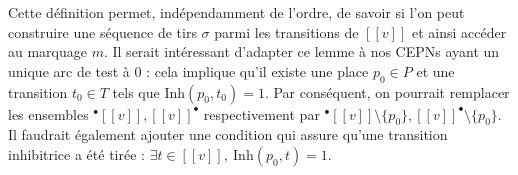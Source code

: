\documentclass{article}
\theoremstyle{remark}
\theoremstyle{remark}
\newcommand{\preb}[1]{{}^\bullet #1}
\newcommand{\postb}[1]{#1^\bullet}
\newcommand{\inhibitor}{\mathrm{Inh}}
\newcommand{\supp}[1]{[\![#1]\!]}
\begin{document}
Cette définition permet, indépendamment de l'ordre, de savoir si l'on peut construire une séquence de tirs $\sigma$ parmi les transitions de $[\![v]\!]$ et ainsi accéder au marquage $m$. Il serait intéressant d'adapter ce lemme à nos CEPNs ayant un unique arc de test à 0 : cela implique qu'il existe une place $p_0 \in P$ et une transition $t_0 \in T$ tels que $\inhibitor(p_0, t_0) = 1$. Par conséquent, on pourrait remplacer les ensembles $\preb{[\![v]\!]}, \postb{[\![v]\!]}$ respectivement par $\preb{[\![v]\!]} \setminus \{p_0\}, \postb{[\![v]\!]} \setminus \{p_0\}$. Il faudrait également ajouter une condition qui assure qu'une transition inhibitrice a été tirée : $\exists t \in \supp{v},\ \inhibitor(p_0, t) = 1$.

\newpage

\printbibliography[title = Références]
\end{document}
